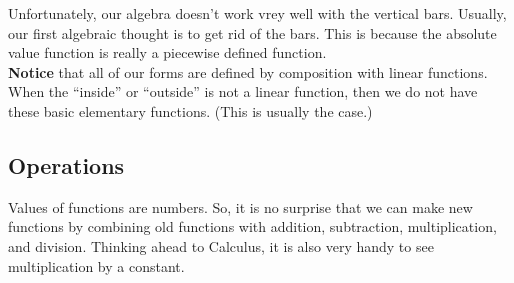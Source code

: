 \documentclass{ximera}
\begin{document}
Unfortunately, our algebra doesn't work vrey well with the vertical bars.  Usually, our first algebraic thought is to get rid of the bars.  This is because the absolute value function is really a piecewise defined function.   \\



\textbf{Notice} that all of our forms are defined by composition with linear functions.  \\

When the ``inside'' or ``outside'' is not a linear function, then we do not have these basic elementary functions. (This is usually the case.)















































\subsection*{Operations}





Values of functions are numbers.  So, it is no surprise that we can make new functions by combining old functions with addition, subtraction, multiplication, and division. Thinking ahead to Calculus, it is also very handy to see multiplication by a constant.\\
\end{document}
